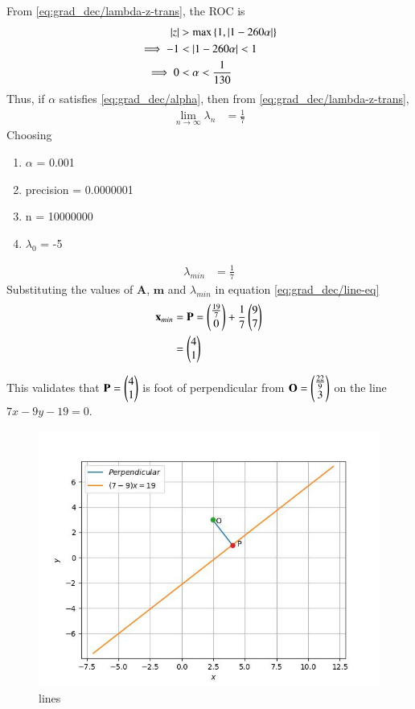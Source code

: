 \documentclass[journal,12pt,twocolumn]{IEEEtran}
\renewcommand{\vec}[1]{\boldsymbol{\mathbf{#1}}}
\begin{document}
From \eqref{eq:grad_dec/lambda-z-trans}, the ROC is
\begin{align}
	\left\vert z\right\vert &> \max\left\{1,\left\vert1- 260\alpha\right\vert\right\} \\
	\implies -1 & < \left\vert1-260\alpha\right\vert < 1 \\
        \label{eq:grad_dec/alpha}
        \implies 0 &< \alpha < \frac{1}{130}
\end{align}
Thus, if $\alpha$ satisfies \eqref{eq:grad_dec/alpha}, then from \eqref{eq:grad_dec/lambda-z-trans}, 
\begin{align}
	\label{eq:grad_dec/conv}
        \lim_{n\to\infty}\lambda_n &= \frac{1}{7}
    \end{align}
Choosing
\begin{enumerate}
 \item $\alpha$ = 0.001
 \item precision = 0.0000001
 \item n = 10000000 
 \item $\lambda_0$ = -5 
\end{enumerate}

\begin{align}
	\lambda_{min} &= \frac{1}{7}
\end{align}
Substituting the values of $\vec{A}$, $\vec{m}$ and $\lambda_{min}$ in equation \eqref{eq:grad_dec/line-eq} 
\begin{align}
	\vec{x}_{min} &= \vec{P} = \myvec{\frac{19}{7} \\ 0} +  \frac{1}{7}\myvec{9 \\ 7}  \\
	&= \myvec{4 \\ 1}
\end{align}

This validates that $\vec{P} = \myvec{4\\1}$ is foot of perpendicular from $\vec{O} = \myvec{\frac{22}{9} \\ 3}$ on the line $7{x} - 9{y} - 19 = 0$.

\begin{figure}[!htb]
    \centering
    \includegraphics[width=\columnwidth]{figs/lines.jpg}
    \caption{lines}
    \label{fig:lines}
\end{figure}
\end{document}
